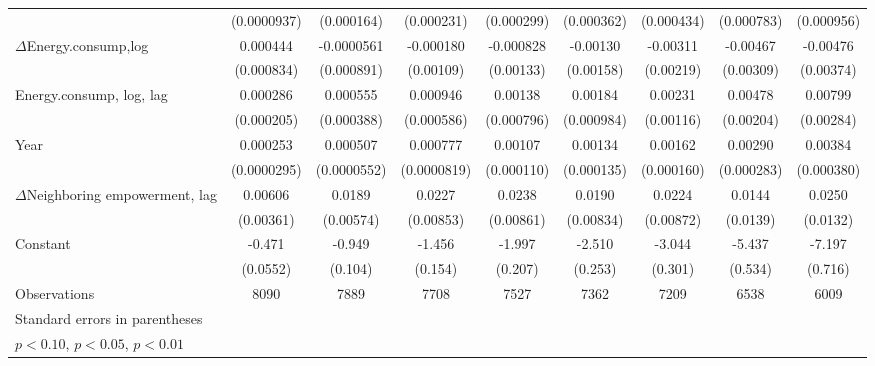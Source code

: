 \begin{table}[htbp]
\begin{tabular}{l*{8}{c}}
                    & (0.0000937)         &  (0.000164)         &  (0.000231)         &  (0.000299)         &  (0.000362)         &  (0.000434)         &  (0.000783)         &  (0.000956)         \\
[1em]
$\Delta$Energy.consump,log           &    0.000444         &  -0.0000561         &   -0.000180         &   -0.000828         &    -0.00130         &    -0.00311         &    -0.00467         &    -0.00476         \\
                    &  (0.000834)         &  (0.000891)         &   (0.00109)         &   (0.00133)         &   (0.00158)         &   (0.00219)         &   (0.00309)         &   (0.00374)         \\
[1em]
Energy.consump, log, lag           &    0.000286         &    0.000555         &    0.000946         &     0.00138\sym{*}  &     0.00184\sym{*}  &     0.00231\sym{**} &     0.00478\sym{**} &     0.00799\sym{***}\\
                    &  (0.000205)         &  (0.000388)         &  (0.000586)         &  (0.000796)         &  (0.000984)         &   (0.00116)         &   (0.00204)         &   (0.00284)         \\
[1em]
Year               &    0.000253\sym{***}&    0.000507\sym{***}&    0.000777\sym{***}&     0.00107\sym{***}&     0.00134\sym{***}&     0.00162\sym{***}&     0.00290\sym{***}&     0.00384\sym{***}\\
                    & (0.0000295)         & (0.0000552)         & (0.0000819)         &  (0.000110)         &  (0.000135)         &  (0.000160)         &  (0.000283)         &  (0.000380)         \\
[1em]
$\Delta$Neighboring empowerment, lag&     0.00606\sym{*}  &      0.0189\sym{***}&      0.0227\sym{***}&      0.0238\sym{***}&      0.0190\sym{**} &      0.0224\sym{**} &      0.0144         &      0.0250\sym{*}  \\
                    &   (0.00361)         &   (0.00574)         &   (0.00853)         &   (0.00861)         &   (0.00834)         &   (0.00872)         &    (0.0139)         &    (0.0132)         \\
[1em]
Constant            &      -0.471\sym{***}&      -0.949\sym{***}&      -1.456\sym{***}&      -1.997\sym{***}&      -2.510\sym{***}&      -3.044\sym{***}&      -5.437\sym{***}&      -7.197\sym{***}\\
                    &    (0.0552)         &     (0.104)         &     (0.154)         &     (0.207)         &     (0.253)         &     (0.301)         &     (0.534)         &     (0.716)         \\
\hline
Observations        &        8090         &        7889         &        7708         &        7527         &        7362         &        7209         &        6538         &        6009         \\
\hline\hline
\multicolumn{9}{l}{\footnotesize Standard errors in parentheses}\\
\multicolumn{9}{l}{\footnotesize \sym{*} \(p<0.10\), \sym{**} \(p<0.05\), \sym{***} \(p<0.01\)}\\
\end{tabular}
\end{table}
